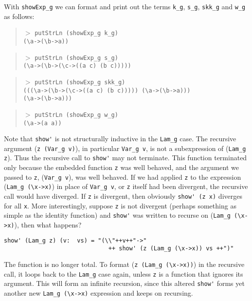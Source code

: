 With \verb|showExp_g| we can format and print out the terms
\verb|k_g|, \verb|s_g|, \verb|skk_g| and \verb|w_g| as follows:
\begin{quote}\noindent
$>$ \verb|putStrLn (showExp_g k_g)|\\
\verb|(\a->(\b->a))|
\end{quote}\vspace*{-1em}
\begin{quote}\noindent
$>$ \verb|putStrLn (showExp_g s_g)|\\
\verb|(\a->(\b->(\c->((a c) (b c)))))|
\end{quote}\vspace*{-1em}
\begin{quote}\noindent
$>$ \verb|putStrLn (showExp_g skk_g)|\\
\verb|(((\a->(\b->(\c->((a c) (b c))))) (\a->(\b->a)))|\\
\verb|(\a->(\b->a)))|
\end{quote}\vspace*{-1em}
\begin{quote}\noindent
$>$ \verb|putStrLn (showExp_g w_g)|\\
\verb|(\a->(a a))|
\end{quote}\vspace*{-.5em}

Note that \verb|show'| is not structurally inductive in the \verb|Lam_g| case.
The recursive argument (\verb|z (Var_g v)|), in particular \verb|Var_g v|,
is not a subexpression of (\verb|Lam_g z|).  Thus the recursive call to
\verb|show'| may not terminate. This function terminated only because
the embedded function \verb|z| was well behaved, and the argument we passed
to \verb|z|, (\verb|Var_g v|), was well behaved. If we had applied \verb|z|
to the expression (\verb|Lam_g (\x->x)|) in place of \verb|Var_g v|,
or \verb|z| itself had been divergent, the recursive call would have diverged.
If \verb|z| is divergent, then obviously \verb|show' (z x)| diverges for
all \verb|x|. More interestingly, suppose \verb|z| is not divergent
(perhaps something as simple as the identity function) and \verb|show'|
was written to recurse on (\verb|Lam_g (\x->x)|), then what happens?
\begin{verbatim}
show' (Lam_g z) (v:  vs) = "(\\"++v++"->"
                              ++ show' (z (Lam_g (\x->x)) vs ++")"
\end{verbatim}
The function is no longer total.  To format (\verb|z (Lam_g (\x->x))|)
in the recursive call, it loops back to the \verb|Lam_g| case again,
unless \verb|z| is a function that ignores its argument.
This will form an infinite recursion, since this altered \verb|show'| forms
yet another new \verb|Lam_g (\x->x)| expression and keeps on recursing.


